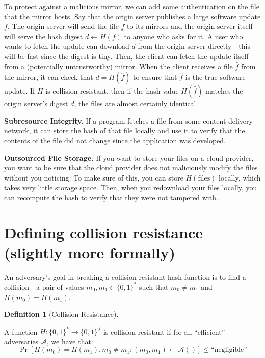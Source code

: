 \documentclass[
  letterpaper,
]{scrbook}
\newcommand{\zo}{\{0,1\}}
\newcommand{\bin}{\zo}
\newcommand{\calA}{\mathcal{A}}
\theoremstyle{definition}
\newtheorem{definition}{Definition}[chapter]
\theoremstyle{plain}
\theoremstyle{plain}
\theoremstyle{remark}
\begin{document}
To protect against a malicious mirror, we can add some authentication on
the file that the mirror hosts. Say that the origin server publishes a
large software update \(f\). The origin server will send the file \(f\)
to its mirrors and the origin server itself will serve the hash digest
\(d\gets H(f)\) to anyone who asks for it. A user who wants to fetch the
update can download \(d\) from the origin server directly---this will be
fast since the digest is tiny. Then, the client can fetch the update
itself from a (potentially untrustworthy) mirror. When the client
receives a file \(\hat f\) from the mirror, it can check that
\(d = H(\hat f)\) to ensure that \(\hat f\) is the true software update.
If \(H\) is collision resistant, then if the hash value \(H(\hat f)\)
matches the origin server's digest \(d\), the files are almost certainly
identical.

\textbf{Subresource Integrity.} If a program fetches a file from some
content delivery network, it can store the hash of that file locally and
use it to verify that the contents of the file did not change since the
application was developed.

\textbf{Outsourced File Storage.} If you want to store your files on a
cloud provider, you want to be sure that the cloud provider does not
maliciously modify the files without you noticing. To make sure of this,
you can store \(H(\text{files})\) locally, which takes very little
storage space. Then, when you redownload your files locally, you can
recompute the hash to verify that they were not tampered with.

\section{Defining collision resistance (slightly more
formally)}\label{defining-collision-resistance-slightly-more-formally}

An adversary's goal in breaking a collision resistant hash function is
to find a collision---a pair of values \(m_0, m_1 \in \zo^*\) such that
\(m_0 \neq m_1\) and \(H(m_0) = H(m_1)\).

\begin{definition}[Collision
Resistance]\protect\hypertarget{def-crhf}{}\label{def-crhf}

A function \(H: \bin^* \rightarrow \bin^{\lambda}\) is
collision-resistant if for all ``efficient'' adversaries \(\calA\), we
have that:
\[ \Pr[H(m_0) = H(m_1), m_0 \neq m_1: (m_0, m_1) \leftarrow \calA()] \leq \text{``negligible''} \]

\end{definition}
\end{document}

